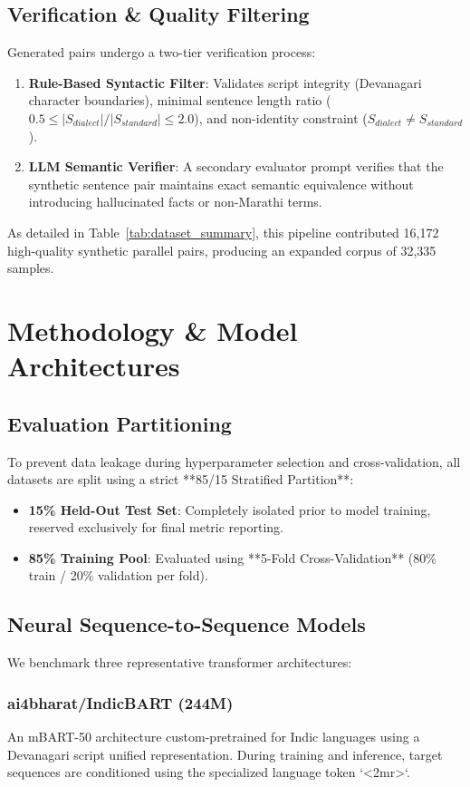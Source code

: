 \documentclass[journal,twocolumn]{IEEEtran}
\begin{document}
\subsection{Verification & Quality Filtering}
Generated pairs undergo a two-tier verification process:
\begin{enumerate}
    \item \textbf{Rule-Based Syntactic Filter}: Validates script integrity (Devanagari character boundaries), minimal sentence length ratio ($0.5 \le |S_{dialect}| / |S_{standard}| \le 2.0$), and non-identity constraint ($S_{dialect} \neq S_{standard}$).
    \item \textbf{LLM Semantic Verifier}: A secondary evaluator prompt verifies that the synthetic sentence pair maintains exact semantic equivalence without introducing hallucinated facts or non-Marathi terms.
\end{enumerate}

As detailed in Table~\ref{tab:dataset_summary}, this pipeline contributed 16,172 high-quality synthetic parallel pairs, producing an expanded corpus of 32,335 samples.

\section{Methodology \& Model Architectures}

\subsection{Evaluation Partitioning}
To prevent data leakage during hyperparameter selection and cross-validation, all datasets are split using a strict **85/15 Stratified Partition**:
\begin{itemize}
    \item \textbf{15\% Held-Out Test Set}: Completely isolated prior to model training, reserved exclusively for final metric reporting.
    \item \textbf{85\% Training Pool}: Evaluated using **5-Fold Cross-Validation** (80\% train / 20\% validation per fold).
\end{itemize}

\subsection{Neural Sequence-to-Sequence Models}
We benchmark three representative transformer architectures:

\subsubsection{ai4bharat/IndicBART (244M)}
An mBART-50 architecture custom-pretrained for Indic languages using a Devanagari script unified representation. During training and inference, target sequences are conditioned using the specialized language token `<2mr>`.
\end{document}

